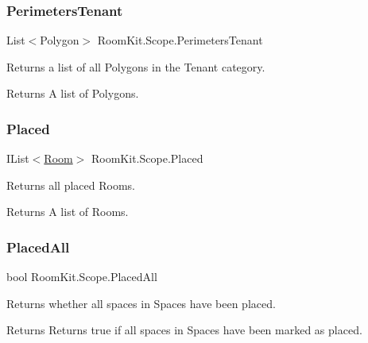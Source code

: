 \subsubsection{\texorpdfstring{Perimeters\+Tenant}{PerimetersTenant}}
{\footnotesize\ttfamily List$<$Polygon$>$ Room\+Kit.\+Scope.\+Perimeters\+Tenant\hspace{0.3cm}{\ttfamily [get]}}



Returns a list of all Polygons in the Tenant category. 

\begin{DoxyReturn}{Returns}
A list of Polygons. 
\end{DoxyReturn}
\mbox{\label{class_room_kit_1_1_scope_a36faac20f6426794ed265d2e6f7671c1}} 
\subsubsection{\texorpdfstring{Placed}{Placed}}
{\footnotesize\ttfamily I\+List$<$\mbox{\hyperlink{class_room_kit_1_1_room}{Room}}$>$ Room\+Kit.\+Scope.\+Placed\hspace{0.3cm}{\ttfamily [get]}}



Returns all placed Rooms. 

\begin{DoxyReturn}{Returns}
A list of Rooms. 
\end{DoxyReturn}
\mbox{\label{class_room_kit_1_1_scope_af42e82ed90f2d533b61f2dc9961a6be4}} 
\subsubsection{\texorpdfstring{Placed\+All}{PlacedAll}}
{\footnotesize\ttfamily bool Room\+Kit.\+Scope.\+Placed\+All\hspace{0.3cm}{\ttfamily [get]}}



Returns whether all spaces in Spaces have been placed. 

\begin{DoxyReturn}{Returns}
Returns true if all spaces in Spaces have been marked as placed. 
\end{DoxyReturn}
\mbox{\label{class_room_kit_1_1_scope_a5d7f4fe62fc696475d893790877dd1c9}} 
